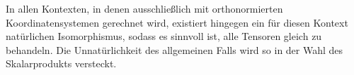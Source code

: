 \begin{sheet}
\begin{remark}
In allen Kontexten, in denen ausschließlich mit orthonormierten Koordinatensystemen gerechnet wird, existiert hingegen ein für diesen Kontext natürlichen Isomorphismus, sodass es sinnvoll ist, alle Tensoren gleich zu behandeln. Die Unnatürlichkeit des allgemeinen Falls wird so in der Wahl des Skalarprodukts versteckt.
\end{remark}
	
\end{sheet}
